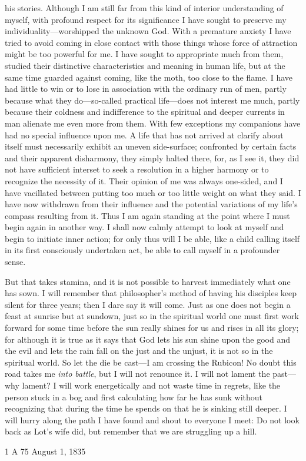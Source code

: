   his stories.
Although I am still far from this kind of interior
  understanding of myself, with profound respect for its
  significance I have sought to preserve my
  individuality---worshipped the unknown God.
With a premature anxiety I have tried to avoid coming in close
  contact with those things whose force of attraction might be too
  powerful for me.
I have sought to appropriate much from them, studied their
  distinctive characteristics and meaning in human life, but at the
  same time guarded against coming, like the moth, too close to
  the flame.
I have had little to win or to lose in association with the
  ordinary run of men, partly because what they do---so-called
  practical life---does not interest me much, partly because their
  coldness and indifference to the spiritual and deeper currents in
  man alienate me even more from them.
With few exceptions my companions have had no special influence
  upon me.
A life that has not arrived at clarify about itself must
  necessarily exhibit an uneven side-surface; confronted by certain
  facts and their apparent disharmony, they simply halted there,
  for, as I see it, they did not have sufficient interset to
  seek a resolution in a higher harmony or to recognize the
  necessity of it.
Their opinion of me was always one-sided, and I have vacillated
  between putting too much or too little weight on what they said.
I have now withdrawn from their influence and the potential
  variations of my life's compass resulting from it.
Thus I am again standing at the point where I must begin
  again in another way.
I shall now calmly attempt to look at myself and begin to
  initiate inner action; for only thus will I be able, like a
  child calling itself  in its first consciously undertaken
  act, be able to call myself  in a profounder sense.

But that takes stamina, and it is not possible to harvest
  immediately what one has sown.
I will remember that philosopher's method of having his
  disciples keep silent for three years; then I dare say it will
  come.
Just as one does not begin a feast at sunrise but at sundown,
  just so in the spiritual world one must first work forward for
  some time before the sun really shines for us and rises in all
  its glory; for although it is true as it says that God lets
  his sun shine upon the good and the evil and lets the rain
  fall on the just and the unjust, it is not so in the
  spiritual world.
So let the die be cast---I am crossing the Rubicon!
No doubt this road takes me \textit{into battle}, but I will
  not renounce it.
I will not lament the past---why lament?
I will work energetically and not waste time in regrets, like
  the person stuck in a bog and first calculating how far he has
  sunk without recognizing that during the time he spends on that
  he is sinking still deeper.
I will hurry along the path I have found and shout to
  everyone I meet: Do not look back as Lot's wife did, but
  remember that we are struggling up a hill.

\begin{flushright}
1 A 75 August 1, 1835
\end{flushright}
